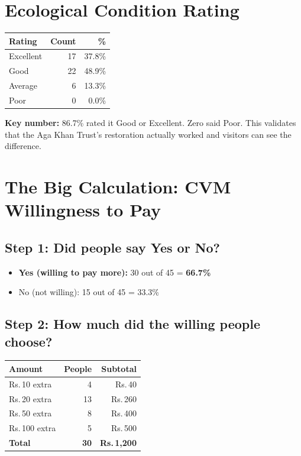 \documentclass[11pt, a4paper]{article}
\newcommand{\rupee}{Rs.\,}
\newenvironment{keybox}{%
    \def\FrameCommand{\textcolor{accent}{\vrule width 2pt}\hspace{8pt}}%
    \MakeFramed{\advance\hsize-\width\FrameRestore}%
}{%
    \endMakeFramed%
}
\begin{document}
\section{Ecological Condition Rating}

\begin{table}[h]
\centering
\begin{tabular}{lrr}
\toprule
\textbf{Rating} & \textbf{Count} & \textbf{\%} \\
\midrule
Excellent & 17 & 37.8\% \\
Good & 22 & 48.9\% \\
Average & 6 & 13.3\% \\
Poor & 0 & 0.0\% \\
\bottomrule
\end{tabular}
\end{table}

\begin{keybox}
\textbf{Key number:} 86.7\% rated it Good or Excellent. Zero said Poor. This validates that the Aga Khan Trust's restoration actually worked and visitors can see the difference.
\end{keybox}

\section{The Big Calculation: CVM Willingness to Pay}

\subsection{Step 1: Did people say Yes or No?}
\begin{itemize}[nosep]
    \item \textbf{Yes (willing to pay more):} 30 out of 45 = \textbf{66.7\%}
    \item No (not willing): 15 out of 45 = 33.3\%
\end{itemize}

\subsection{Step 2: How much did the willing people choose?}

\begin{table}[h]
\centering
\begin{tabular}{lrr}
\toprule
\textbf{Amount} & \textbf{People} & \textbf{Subtotal} \\
\midrule
\rupee 10 extra & 4 & \rupee 40 \\
\rupee 20 extra & 13 & \rupee 260 \\
\rupee 50 extra & 8 & \rupee 400 \\
\rupee 100 extra & 5 & \rupee 500 \\
\midrule
\textbf{Total} & \textbf{30} & \textbf{\rupee 1,200} \\
\bottomrule
\end{tabular}
\end{table}
\end{document}
